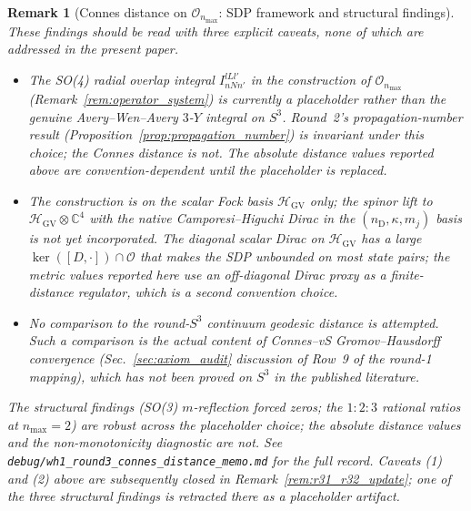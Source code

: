 \documentclass[11pt]{article}
\newtheorem{remark}{Remark}
\begin{document}
\begin{remark}[Connes distance on $\mathcal{O}_{n_{\max}}$: SDP framework
and structural findings]
These findings should be read with three explicit caveats, none of
which are addressed in the present paper.

\begin{itemize}
\item The SO(4) radial overlap integral $I_{n N n'}^{l L l'}$ in the
   construction of $\mathcal{O}_{n_{\max}}$
   (Remark~\ref{rem:operator_system}) is currently a placeholder rather
   than the genuine Avery--Wen--Avery $3$-$Y$ integral on $S^3$.
   Round~2's propagation-number result
   (Proposition~\ref{prop:propagation_number}) is invariant under this
   choice; the Connes distance is not.  The absolute distance values
   reported above are convention-dependent until the placeholder is
   replaced.

\item The construction is on the scalar Fock basis $\mathcal{H}_{\mathrm{GV}}$
   only; the spinor lift to $\mathcal{H}_{\mathrm{GV}} \otimes
   \mathbb{C}^4$ with the native Camporesi--Higuchi Dirac in the
   $(n_{\mathrm{D}}, \kappa, m_j)$ basis is not yet incorporated.  The
   diagonal scalar Dirac on $\mathcal{H}_{\mathrm{GV}}$ has a large
   $\ker([D, \cdot]) \cap \mathcal{O}$ that makes the SDP unbounded on
   most state pairs; the metric values reported here use an
   off-diagonal Dirac proxy as a finite-distance regulator, which is a
   second convention choice.

\item No comparison to the round-$S^3$ continuum geodesic distance is
   attempted.  Such a comparison is the actual content of Connes--vS
   Gromov--Hausdorff convergence
   (Sec.~\ref{sec:axiom_audit} discussion of Row~9 of the round-1
   mapping), which has not been proved on $S^3$ in the published
   literature.
\end{itemize}

The structural findings (SO(3) $m$-reflection forced zeros; the $1 : 2
: 3$ rational ratios at $n_{\max} = 2$) are robust across the
placeholder choice; the absolute distance values and the
non-monotonicity diagnostic are not.  See
\texttt{debug/wh1\_round3\_connes\_distance\_memo.md} for the full
record.  Caveats (1) and (2) above are subsequently closed in
Remark~\ref{rem:r31_r32_update}; one of the three structural
findings is retracted there as a placeholder artifact.
\end{remark}
\end{document}
